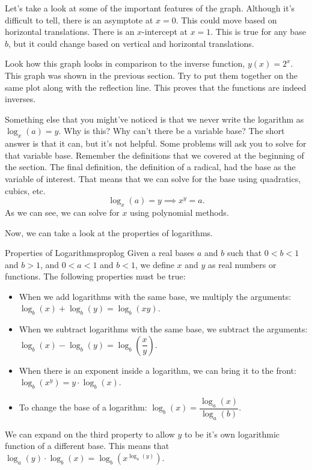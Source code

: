 \documentclass[../book.tex]{subfiles}
\begin{document}
Let's take a look at some of the important features of the graph.  Although it's difficult to tell, there is an asymptote at $x=0$.  This could move based on horizontal translations.  There is an $x$-intercept at $x=1$.  This is true for any base $b$, but it could change based on vertical and horizontal translations.

Look how this graph looks in comparison to the inverse function, $y(x)=2^x$.  This graph was shown in the previous section.  Try to put them together on the same plot along with the reflection line.  This proves that the functions are indeed inverses.

Something else that you might've noticed is that we never write the logarithm as $\log_x(a)=y$.  Why is this?  Why can't there be a variable base?  The short answer is that it can, but it's not helpful.  Some problems will ask you to solve for that variable base.  Remember the definitions that we covered at the beginning of the section.  The final definition, the definition of a radical, had the base as the variable of interest.  That means that we can solve for the base using quadratics, cubics, etc.  $$\log_x(a)=y \implies x^y=a.$$  As we can see, we can solve for $x$ using polynomial methods.

Now, we can take a look at the properties of logarithms.  
\begin{theorem}{Properties of Logarithms}{proplog}
Given a real bases $a$ and $b$ such that $0<b<1$ and $b>1$, and $0<a<1$ and $b<1$, we define $x$ and $y$ as real numbers or functions.  The following properties must be true: \begin{itemize}
    \item When we add logarithms with the same base, we multiply the arguments: $\log_b(x)+\log_b(y)=\log_b(xy)$.
    \item When we subtract logarithms with the same base, we subtract the arguments: $\log_b(x)-\log_b(y)=\log_b\left(\dfrac{x}{y}\right)$.
    \item When there is an exponent inside a logarithm, we can bring it to the front: $\log_b(x^y)=y\cdot \log_b(x)$.
    \item To change the base of a logarithm: $\log_b(x)=\dfrac{\log_a(x)}{\log_a(b)}$.
\end{itemize}
\end{theorem}
\begin{remark}
We can expand on the third property to allow $y$ to be it's own logarithmic function of a different base.  This means that $\log_a(y)\cdot \log_b(x)=\log_b\left(x^{\log_a(y)}\right)$.
\end{remark}
\end{document}
